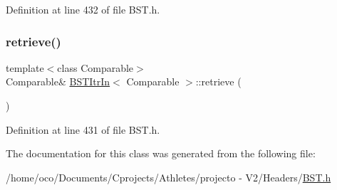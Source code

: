 Definition at line 432 of file B\+S\+T.\+h.

\hypertarget{class_b_s_t_itr_in_ac7ac215c1247bd25fc1fdb8053826a32}{}\label{class_b_s_t_itr_in_ac7ac215c1247bd25fc1fdb8053826a32} 
\subsubsection{\texorpdfstring{retrieve()}{retrieve()}}
{\footnotesize\ttfamily template$<$class Comparable$>$ \\
Comparable\& \hyperlink{class_b_s_t_itr_in}{B\+S\+T\+Itr\+In}$<$ Comparable $>$\+::retrieve (\begin{DoxyParamCaption}{ }\end{DoxyParamCaption})\hspace{0.3cm}{\ttfamily [inline]}}



Definition at line 431 of file B\+S\+T.\+h.



The documentation for this class was generated from the following file\+:\begin{DoxyCompactItemize}
\item 
/home/oco/\+Documents/\+Cprojects/\+Athletes/projecto -\/ V2/\+Headers/\hyperlink{_b_s_t_8h}{B\+S\+T.\+h}\end{DoxyCompactItemize}
